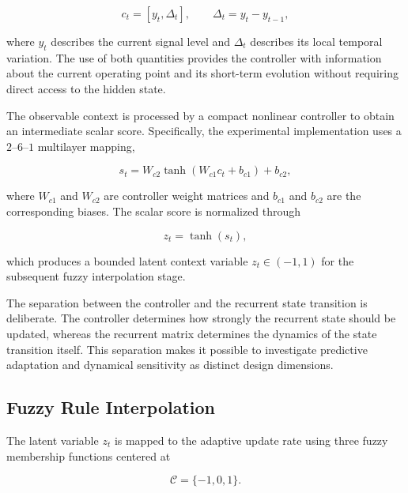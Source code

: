 \documentclass[journal]{IEEEtran}
\begin{document}
\begin{equation}
	c_t
	=
	[y_t,\Delta_t],
	\qquad
	\Delta_t=y_t-y_{t-1},
	\label{eq:context}
\end{equation}

where $y_t$ describes the current signal level and $\Delta_t$ describes its local temporal variation. The use of both quantities provides the controller with information about the current operating point and its short-term evolution without requiring direct access to the hidden state.

The observable context is processed by a compact nonlinear controller to obtain an intermediate scalar score. Specifically, the experimental implementation uses a $2$--$6$--$1$ multilayer mapping,

\begin{equation}
	s_t
	=
	W_{c2}
	\tanh
	\left(
	W_{c1}c_t+b_{c1}
	\right)
	+b_{c2},
	\label{eq:controller_score}
\end{equation}

where $W_{c1}$ and $W_{c2}$ are controller weight matrices and $b_{c1}$ and $b_{c2}$ are the corresponding biases. The scalar score is normalized through

\begin{equation}
	z_t=\tanh(s_t),
	\label{eq:z_definition}
\end{equation}

which produces a bounded latent context variable $z_t\in(-1,1)$ for the subsequent fuzzy interpolation stage.

The separation between the controller and the recurrent state transition is deliberate. The controller determines how strongly the recurrent state should be updated, whereas the recurrent matrix determines the dynamics of the state transition itself. This separation makes it possible to investigate predictive adaptation and dynamical sensitivity as distinct design dimensions.

\subsection{Fuzzy Rule Interpolation}
\label{subsec:fuzzy_interpolation}

The latent variable $z_t$ is mapped to the adaptive update rate using three fuzzy membership functions centered at

\begin{equation}
	\mathcal{C}=\{-1,0,1\}.
	\label{eq:fuzzy_centers}
\end{equation}
\end{document}

